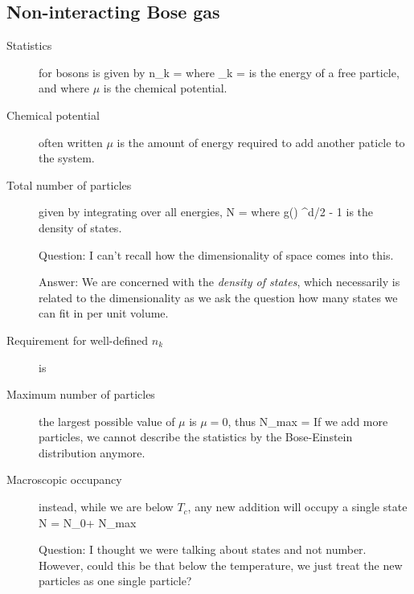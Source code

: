 \subsection{Non-interacting Bose gas}
\begin{description}
\item[Statistics] for bosons is given by 
\beq
n_k = 	
\eeq
where
\beq
\epsilon_k = 
\eeq
is the energy of a free particle, and where $\mu$ is the chemical potential. 

\item[Chemical potential] often written $\mu$ is the amount of energy required to add another paticle to the system. 

\item[Total number of particles] given by integrating over all energies, 
\beq
N = \int \intd \epsilon {}
\eeq
where
\beq
g(\epsilon) \propto \epsilon^{d/2 - 1}
\eeq
is the density of states. 

Question: I can't recall how the dimensionality of space comes into this. 

Answer: We are concerned with the \emph{density of states}, which necessarily is related to the dimensionality as we ask the question how many states we can fit in per unit volume. 

\item[Requirement for well-defined $n_k$] is 
\beq
\mu {}
\eeq

\item[Maximum number of particles]  the largest possible value of $\mu$ is $\mu = 0$, thus
\beq
N_{max} = \int \intd \epsilon {}
\eeq
If we add more particles, we cannot describe the statistics by the Bose-Einstein distribution anymore. 

\item[Macroscopic occupancy] instead, while we are below $T_c$, any new addition will occupy a single state
\beq
N = N_0+ N_{max}
\eeq

Question: I thought we were talking about states and not number. However, could this be that below the temperature, we just treat the new particles as one single particle? 



\end{description}
